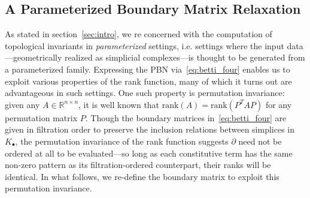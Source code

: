 \documentclass[10pt]{article}
\numberwithin{equation}{section}
\newcommand{\+}{%
	\raisebox{0.18ex}{\scaleobj{0.55}{+}}
}
\theoremstyle{definition}
\begin{document}
\subsection{A Parameterized Boundary Matrix Relaxation}
As stated in section~\ref{sec:intro}, we re concerned with the computation of topological invariants in \emph{parameterized} settings, i.e. settings where the input data---geometrically realized as simplicial complexes---is thought to be generated from a parameterized family.  
Expressing the PBN via~\eqref{eq:betti_four} enables us to exploit various properties of the rank function, many of which it turns out are advantageous in such settings. One such property is permutation invariance: given any $A \in \mathbb{R}^{n \times n}$, it is well known that $\mathrm{rank}(A) = \mathrm{rank}(P^T A P)$ for any permutation matrix $P$. Though  the boundary matrices in~\eqref{eq:betti_four} are given in filtration order to preserve the inclusion relations between simplices in $K_\bullet$, the permutation invariance of the rank function suggests $\partial$ need not be ordered at all to be evaluated---so long as each constitutive term has the same non-zero pattern as its filtration-ordered counterpart, their ranks will be identical.
In what follows, we re-define the boundary matrix to exploit this permutation invariance. 
 
\end{document}

